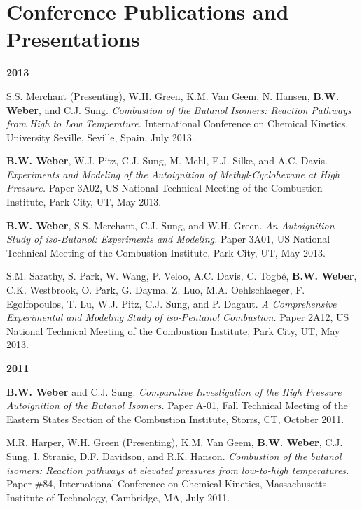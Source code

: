 \section{{\sectionfont Conference Publications and Presentations}}

\begin{bibsection}
\item[] \textbf{2013}
\item[] S.S. Merchant (Presenting), W.H. Green, K.M. Van Geem, N.
        Hansen, \textbf{B.W. Weber}, and C.J. Sung.
        \textit{Combustion of the Butanol Isomers: Reaction Pathways
        from High to Low Temperature.}  International
        Conference on Chemical Kinetics, University Seville, Seville,
        Spain, July 2013.

\item[] \textbf{B.W. Weber}, W.J. Pitz, C.J. Sung, M. Mehl,
        E.J. Silke, and A.C. Davis. \textit{Experiments and Modeling of
        the Autoignition of Methyl-Cyclohexane at High Pressure.}
        Paper 3A02,  US National Technical Meeting of the
        Combustion Institute, Park City, UT, May 2013.

\item[] \textbf{B.W. Weber}, S.S. Merchant, C.J. Sung, and W.H. Green.
        \textit{An Autoignition Study of iso-Butanol: Experiments and
        Modeling.} Paper 3A01,  US National Technical
        Meeting of the Combustion Institute, Park City, UT, May 2013.

\item[] S.M. Sarathy, S. Park, W. Wang, P. Veloo, A.C. Davis,
        C. Togbé, \textbf{B.W. Weber}, C.K. Westbrook, O. Park,
        G. Dayma, Z. Luo, M.A. Oehlschlaeger, F. Egolfopoulos, T. Lu,
        W.J. Pitz, C.J. Sung, and P. Dagaut. \textit{A Comprehensive
        Experimental and Modeling Study of iso-Pentanol Combustion.}
        Paper 2A12,  US National Technical Meeting of the
        Combustion Institute, Park City, UT, May 2013.

\item[] \textbf{2011}
\item[] \textbf{B.W. Weber} and C.J. Sung. \textit{Comparative
        Investigation of the High Pressure Autoignition of the Butanol
        Isomers.} Paper A-01, Fall Technical Meeting of the Eastern
        States Section of the Combustion Institute, Storrs, CT, October
        2011.

\item[] M.R. Harper, W.H. Green (Presenting), K.M. Van Geem,
        \textbf{B.W. Weber}, C.J. Sung, I. Stranic, D.F. Davidson,
        and R.K. Hanson. \textit{Combustion of the butanol isomers:
        Reaction pathways at elevated pressures from low-to-high
        temperatures.} Paper \#84,  International
        Conference on Chemical Kinetics, Massachusetts Institute of
        Technology, Cambridge, MA, July 2011.


\end{bibsection}
